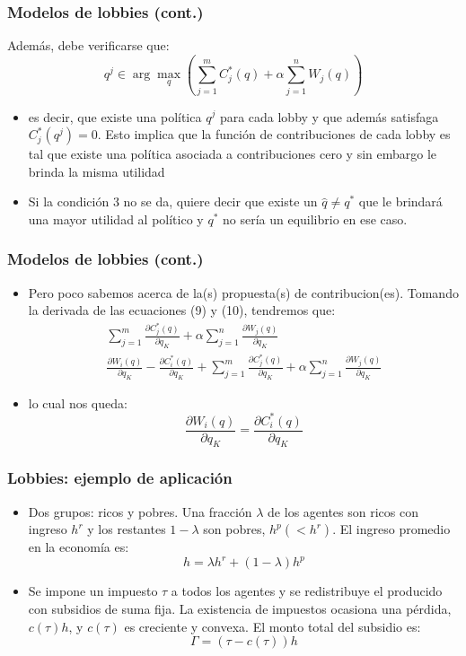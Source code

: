 \documentclass[14pt,aspectratio=169]{beamer}
\begin{document}
\begin{frame}
\frametitle{Modelos de lobbies (cont.)}
Además, debe verificarse que:
\begin{equation}
q^j \in \arg\max_q (\sum_{j=1}^m C_j^*(q)+\alpha \sum_{j=1}^n W_j(q))
\end{equation}
\begin{itemize}
\item es decir, que existe una política $q^j$ para cada lobby y que además satisfaga $C^*_j(q^j)=0$. Esto implica que la función de contribuciones de cada lobby es tal que existe una política asociada a contribuciones cero y sin embargo le brinda la misma utilidad
\item Si la condición 3 no se da, quiere decir que existe un $\hat{q} \neq q^*$ que le brindará una mayor utilidad al político y $q^*$ no sería un equilibrio en ese caso.
\end{itemize}
\end{frame}


\begin{frame}
\frametitle{Modelos de lobbies (cont.)}
\begin{itemize}
\item Pero poco sabemos acerca de la(s) propuesta(s) de contribucion(es). Tomando la derivada de las ecuaciones (9) y (10), tendremos que:
\begin{align}
\sum_{j=1}^m \frac{\partial C_j^*(q)}{\partial q_K} + \alpha \sum_{j=1}^n \frac{\partial W_j(q)}{\partial q_K} \\
\frac{\partial W_i(q)}{\partial q_K}- \frac{\partial C_i^*(q)}{\partial q_K}+\sum_{j=1}^m \frac{\partial C_j^*(q)}{\partial q_K} + \alpha \sum_{j=1}^n \frac{\partial W_j(q)}{\partial q_K}
\end{align}
\item lo cual nos queda:
\begin{equation}
\frac{\partial W_i(q)}{\partial q_K} = \frac{\partial C_i^*(q)}{\partial q_K}
\end{equation}
\end{itemize}
\end{frame}


\begin{frame}
\frametitle{Lobbies: ejemplo de aplicación}
\begin{itemize}
\item Dos grupos: ricos y pobres. Una fracción $\lambda$ de los agentes son ricos con ingreso $h^r$ y los restantes $1-\lambda$ son pobres, $h^p (<h^r)$. El ingreso promedio en la economía es:
\begin{equation}
h=\lambda h^r + (1-\lambda)h^p 
\end{equation}
\item Se impone un impuesto $\tau$ a todos los agentes y se redistribuye el producido con subsidios de suma fija. La existencia de impuestos ocasiona una pérdida, $c(\tau)h$, y $c(\tau)$ es creciente y convexa. El monto total del subsidio es:
\begin{equation}
\Gamma=(\tau-c(\tau))h
\end{equation} 
\end{itemize}
\end{frame}
\end{document}
